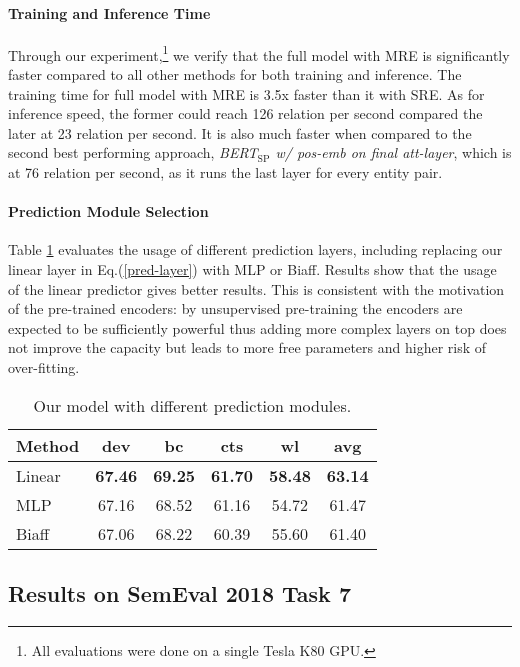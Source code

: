\documentclass[11pt,a4paper]{article}
\begin{document}
\paragraph{Training and Inference Time}
Through our experiment,\footnote{All evaluations were done on a single Tesla K80 GPU.} we verify that the full model with MRE is significantly faster compared to all other methods for both training and inference. The training time for full model with MRE is 3.5x faster than it with SRE. As for inference speed, the former could reach 126 relation per second compared the later at 23 relation per second. It is also much faster when compared to the second best performing approach, \emph{BERT$_{\textrm{SP}}$ w/ pos-emb on final att-layer}, which is at 76 relation per second, as it runs the last layer for every entity pair.


\paragraph{Prediction Module Selection}
Table \ref{tab:prediction_ablation} evaluates the usage of different prediction layers, including replacing our linear layer in Eq.(\ref{pred-layer}) with MLP or Biaff. Results show that the usage of the linear predictor gives better results. This is consistent with the motivation of the pre-trained encoders: by unsupervised pre-training the encoders are expected to be sufficiently powerful thus adding more complex layers on top does not improve the capacity but leads to more free parameters and higher risk of over-fitting.

\begin{table}[!t]
\small
\centering
\begin{tabular}{lccccc}
\toprule
\textbf{Method}                                      & \textbf{dev} & \textbf{bc} & \textbf{cts} & \textbf{wl} & \textbf{avg} \\ \midrule
Linear            & \bf 67.46        & \bf 69.25          & \bf 61.70          & \textbf{58.48} & \textbf{63.14} \\
MLP &    67.16 & 68.52 & 61.16 & 54.72 & 61.47  \\ 
Biaff&   67.06 & 68.22 & 60.39 & 55.60 & 61.40 \\ 
\bottomrule
\end{tabular}
\caption{\small Our model with different prediction modules.}
\label{tab:prediction_ablation}
\end{table}

\subsection{Results on SemEval 2018 Task 7}
\end{document}
